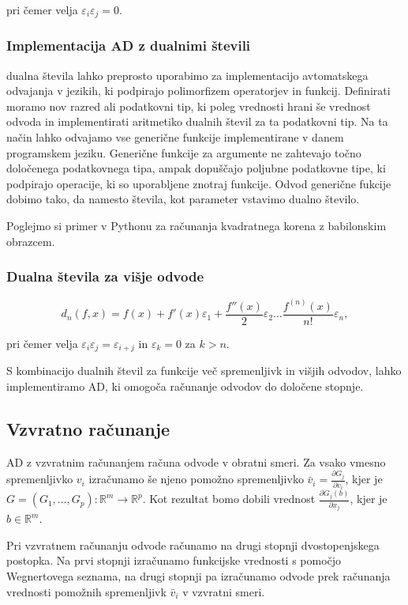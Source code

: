 \documentclass[12pt,slovene]{article}
\newcommand{\RR}{\mathbb R}
\begin{document}
pri čemer velja $\varepsilon_i\varepsilon_j = 0$.

\subsubsection{Implementacija AD z dualnimi števili}

dualna števila lahko preprosto uporabimo za implementacijo avtomatskega odvajanja v jezikih, ki podpirajo polimorfizem operatorjev in funkcij. Definirati moramo nov razred ali podatkovni tip, ki poleg vrednosti hrani še 
vrednost odvoda in implementirati aritmetiko dualnih števil za ta podatkovni tip. Na ta način lahko odvajamo vse generične funkcije implementirane v danem programskem jeziku. Generične funkcije za argumente ne zahtevajo točno določenega podatkovnega tipa, ampak dopuščajo poljubne podatkovne tipe, ki podpirajo operacije, ki so uporabljene znotraj funkcije. Odvod generične fukcije dobimo tako, da namesto števila, kot parameter vstavimo dualno število.

Poglejmo si primer v Pythonu za računanja kvadratnega korena z babilonskim obrazcem.

\subsubsection{Dualna števila za višje odvode}

$$d_n(f, x) = f(x) + f'(x)\varepsilon_1 + \frac{f''(x)}{2}\varepsilon_2\ldots \frac{f^{(n)}(x)}{n!}\varepsilon_n,$$

pri čemer velja $\varepsilon_i\varepsilon_j = \varepsilon_{i+j}$ in $\varepsilon_k = 0$ za $k>n$.


S kombinacijo dualnih števil za funkcije več spremenljivk in višjih odvodov, lahko implementiramo AD, ki omogoča računanje odvodov do določene stopnje.

\subsection{Vzvratno računanje}

AD z vzvratnim računanjem računa odvode v obratni smeri. Za vsako vmesno spremenljivko $v_i$ izračunamo še njeno pomožno spremenljivko $\bar v_i=\frac{\partial G_j}{\partial v_i}$, kjer je $G=(G_1,\ldots,G_p):\RR^m\to \RR^p$. Kot rezultat bomo dobili vrednost 
$\frac{\partial G_j(b)}{\partial x_j}$,
kjer je $b\in \RR^m$.

Pri vzvratnem računanju odvode računamo na drugi stopnji dvostopenjskega postopka. Na prvi stopnji izračunamo funkcijske vrednosti s pomočjo Wegnertovega seznama, na drugi stopnji pa izračunamo odvode prek računanja 
vrednosti pomožnih spremenljivk $\bar v_i$ v vzvratni smeri.
\end{document}
